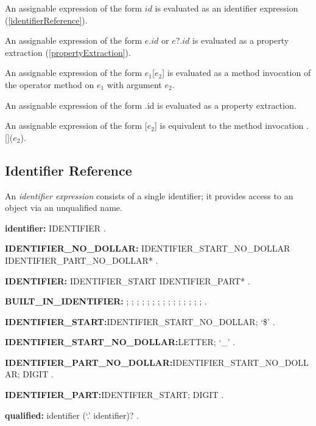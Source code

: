 \documentclass{article}
\newcommand{\code}[1]{{\sf #1}}
\begin{document}
\LMHash{}
An assignable expression of the form $id$ is evaluated as an identifier expression (\ref{identifierReference}).


\LMHash{}
An assignable expression of the form $e.id$ or $e?.id$ is evaluated as a property extraction  (\ref{propertyExtraction}).

\LMHash{}
An assignable expression of the form \code{$e_1$[$e_2$]} is evaluated as a method invocation of the operator method \code{[]} on $e_1$ with argument $e_2$.

\LMHash{}
An assignable expression of the form \code{\SUPER{}.id}  is evaluated as a property extraction.

\LMHash{}
An assignable expression of the form \code{\SUPER{}[$e_2$]} is equivalent to the method invocation  \code{\SUPER{}.[]($e_2$)}.

\subsection{ Identifier Reference}

\LMHash{}
An {\em identifier expression} consists of a single identifier; it provides access to an object via an unqualified name.

\begin{grammar}
{\bf identifier:}
     IDENTIFIER
     .


 {\bf IDENTIFIER\_NO\_DOLLAR:}
      IDENTIFIER\_START\_NO\_DOLLAR IDENTIFIER\_PART\_NO\_DOLLAR*
    .

{\bf IDENTIFIER:}
      IDENTIFIER\_START IDENTIFIER\_PART*
    .

{\bf BUILT\_IN\_IDENTIFIER:} \ABSTRACT{};
     \AS{};
     \DEFERRED{};
     \DYNAMIC{};
     \EXPORT{};
     \EXTERNAL{};
     \FACTORY{};
     \GET{};
     \IMPLEMENTS{};
     \IMPORT{};
     \LIBRARY{};
     \OPERATOR{};
     \PART{};
      \SET{};
      \STATIC{};
     \TYPEDEF{}
    .

 {\bf IDENTIFIER\_START:}IDENTIFIER\_START\_NO\_DOLLAR;
      `\$'
    .

{\bf IDENTIFIER\_START\_NO\_DOLLAR:}LETTER;
      `\_'
    .

{\bf  IDENTIFIER\_PART\_NO\_DOLLAR:}IDENTIFIER\_START\_NO\_DOLLAR;
      DIGIT
    .


{\bf IDENTIFIER\_PART:}IDENTIFIER\_START;
      DIGIT
    .



{\bf qualified:}
      identifier (`{\escapegrammar .}' identifier)?
      .
\end{grammar}
\end{document}
